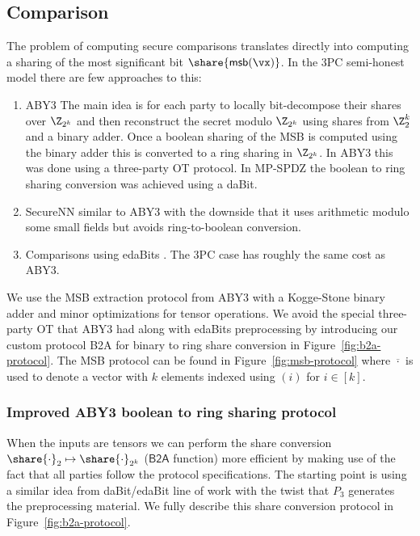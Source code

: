 \subsection{Comparison}


The problem of computing secure comparisons translates directly into computing a sharing of the most significant bit $\share{\mathsf{msb}(\vx)}$.
In the 3PC semi-honest model there are few approaches to this:
\begin{enumerate}
   \item ABY3 \cite{CCS:MohRin18} The main idea is for
   each party to locally bit-decompose their shares over $\Z_{2^k}$ and then
   reconstruct the secret modulo $\Z_{2^k}$ using shares from $\Z^k_2$ and a
   binary adder. Once a boolean sharing of the MSB is computed using the binary adder
   this is converted to a ring sharing in $\Z_{2^k}$.
   In ABY3 this was done using a three-party OT protocol. In MP-SPDZ \cite{CCS:Keller20} 
   the boolean to ring sharing conversion was achieved using a daBit.
   \item SecureNN \cite{PoPETS:WagGupCha19} 
   similar to ABY3 with the downside that it uses arithmetic modulo
   some small fields but avoids ring-to-boolean conversion.
  \item Comparisons using edaBits \cite{C:EGKRS20}. The 3PC case has roughly the same cost as ABY3.
\end{enumerate}

We use the MSB extraction protocol from ABY3 with a Kogge-Stone binary adder and minor optimizations for tensor operations. We avoid the special three-party OT that ABY3 had along with edaBits preprocessing by introducing our custom protocol \textsf{B2A} for binary to ring share conversion in Figure~\ref{fig:b2a-protocol}.
The MSB protocol can be found in Figure~\ref{fig:msb-protocol} where $\overline{\cdot}$ is used to denote a vector with $k$ elements indexed using $(i)$ for $i \in [k]$.




\subsubsection{Improved ABY3 boolean to ring sharing protocol}
When the inputs are tensors we can perform the share conversion $\share{\cdot}_2
\mapsto \share{\cdot}_{2^k}$ ($\mathsf{B2A}$ function)
more efficient by making use of the fact that all parties
follow the protocol specifications. The starting point is using a similar idea
from daBit/edaBit \cite{INDOCRYPT:RotWoo19,C:EGKRS20}
line of work with the twist that $P_3$ generates the preprocessing
material. We fully describe this share conversion protocol in Figure~\ref{fig:b2a-protocol}.

